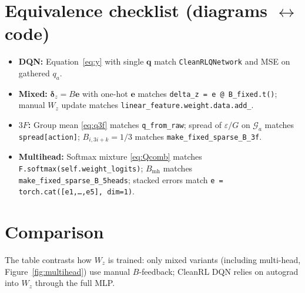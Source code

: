 \documentclass[11pt]{article}
\begin{document}
\section{Equivalence checklist (diagrams $\leftrightarrow$ code)}
\label{sec:check}

\begin{itemize}
  \item \textbf{DQN:} Equation~\eqref{eq:y} with single $\mathbf{q}$ match \texttt{CleanRLQNetwork} and MSE on gathered $q_a$.
  \item \textbf{Mixed:} $\boldsymbol{\delta}_z = B\mathbf{e}$ with one-hot $\mathbf{e}$ matches \texttt{delta\_z = e @ B\_fixed.t()}; manual $W_z$ update matches \texttt{linear\_feature.weight.data.add\_}.
  \item \textbf{$3F$:} Group mean \eqref{eq:q3f} matches \texttt{q\_from\_raw}; spread of $\varepsilon/G$ on $\mathcal{G}_a$ matches \texttt{spread[action]}; $B_{i,3i+k}=1/3$ matches \texttt{make\_fixed\_sparse\_B\_3f}.
  \item \textbf{Multihead:} Softmax mixture \eqref{eq:Qcomb} matches \texttt{F.softmax(self.weight\_logits)}; $B_{\mathrm{mh}}$ matches \texttt{make\_fixed\_sparse\_B\_5heads}; stacked errors match \texttt{e = torch.cat([e1,\ldots,e5], dim=1)}.
\end{itemize}

\section{Comparison}
\label{sec:compare}

\begin{table}[ht]
\centering
\caption{How each architecture trains the linear feature layer $W_z$ vs.\ the trunk (readout).}
\label{tab:compare}
\end{table}

The table contrasts how $W_z$ is trained: only mixed variants (including multi-head, Figure~\ref{fig:multihead}) use manual $B$-feedback; CleanRL DQN relies on autograd into $W_z$ through the full MLP.
\end{document}
